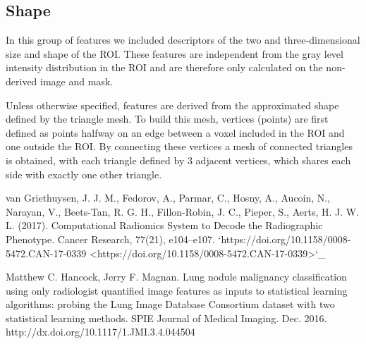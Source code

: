 \documentclass[12pt]{article}
\begin{document}
	\subsection{Shape}
In this group of features we included descriptors of the two and three-dimensional size and shape of the ROI. These features are independent from the gray level intensity distribution in the ROI and are therefore only calculated on the non-derived image and mask.

Unless otherwise specified, features are derived from the approximated shape defined by the triangle mesh. To build this mesh, vertices (points) are first defined as points halfway on an edge between a voxel included in the ROI and one outside the ROI. By connecting these vertices a mesh of connected triangles is obtained, with each triangle defined by 3 adjacent vertices, which shares each side with exactly one other triangle.

	\begin{thebibliography}{99}

van Griethuysen, J. J. M., Fedorov, A., Parmar, C., Hosny, A., Aucoin, N., Narayan, V., Beets-Tan, R. G. H., Fillon-Robin, J. C., Pieper, S., Aerts, H. J. W. L. (2017). Computational Radiomics System to Decode the Radiographic Phenotype. Cancer Research, 77(21), e104–e107. `https://doi.org/10.1158/0008-5472.CAN-17-0339 <https://doi.org/10.1158/0008-5472.CAN-17-0339>`_

Matthew C. Hancock, Jerry F. Magnan.  Lung nodule malignancy classification using only radiologist quantified image features as inputs to statistical learning algorithms: probing the Lung Image Database Consortium dataset with two statistical learning methods.  SPIE Journal of Medical Imaging. Dec. 2016.  http://dx.doi.org/10.1117/1.JMI.3.4.044504

	\end{thebibliography}
\end{document}
